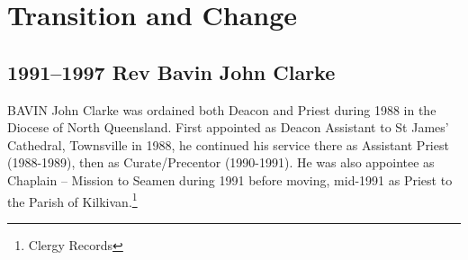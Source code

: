 \balance


\printendnotes[custom]
\setcounter{endnote}{0}
\chapter{Transition and Change}
\nobalance


\section{1991--1997 Rev Bavin John Clarke}



\lettrine[lines=3]{B}{AVIN}
 John Clarke was ordained both Deacon and Priest during 1988 in the Diocese of North Queensland. First appointed as Deacon Assistant to St James' Cathedral, Townsville in 1988, he continued his service there as Assistant Priest (1988-1989), then as Curate/Precentor (1990-1991). He was also appointee as Chaplain -- Mission to Seamen during 1991 before moving, mid-1991 as Priest to the Parish of Kilkivan.\footnote{Clergy Records}







